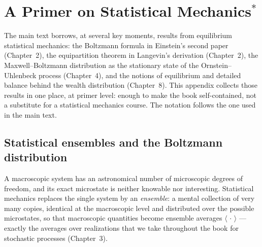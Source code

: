 \chapter[A Primer on Statistical Mechanics*]{A Primer on Statistical Mechanics\texorpdfstring{$^*$}{*}}
\label{app:statmech}

The main text borrows, at several key moments, results from equilibrium statistical mechanics: the Boltzmann formula in Einstein's second paper (Chapter~2), the equipartition theorem in Langevin's derivation (Chapter~2), the Maxwell--Boltzmann distribution as the stationary state of the Ornstein--Uhlenbeck process (Chapter~4), and the notions of equilibrium and detailed balance behind the wealth distribution (Chapter~8).
This appendix collects those results in one place, at primer level: enough to make the book self-contained, not a substitute for a statistical mechanics course\cite{Sethna2021, Gardiner2009}.
The notation follows the one used in the main text.


\section{Statistical ensembles and the Boltzmann distribution}
\label{app:ensembles}

A macroscopic system has an astronomical number of microscopic degrees of freedom, and its exact microstate is neither knowable nor interesting.
Statistical mechanics replaces the single system by an \emph{ensemble}: a mental collection of very many copies, identical at the macroscopic level and distributed over the possible microstates, so that macroscopic quantities become ensemble averages $\langle\,\cdot\,\rangle$ --- exactly the averages over realizations that we take throughout the book for stochastic processes (Chapter~3).


